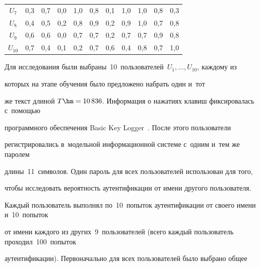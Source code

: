 \begin{table}
\begin{center}
\begin{tabular}{|c|c|c|c|c|c|c|c|c|c|c|}
         $U_7$&0,3&0,7&0,0&1,0&0,8&0,1&\cellcolor[gray]{.6}1,0&1,0&0,8&0,3\\        




         $U_8$&0,4&0,5&0,2&0,8&0,9&0,2&0,9&\cellcolor[gray]{.6}1,0&0,7&0,8\\




         $U_9$&0,6&0,6&0,0&0,7&0,7&0,2&0,7&0,7&\cellcolor[gray]{.6}0,9&0,8\\




         \hphantom{$_1$}$U_{10}$&0,7&0,4&0,1&0,2&0,7&0,6&0,4&0,8&0,7&\cellcolor[gray]{.6}         1,0\\


        \hline


        \end{tabular}


       \end{center}


       \vspace*{-12pt}


\end{table}





Для исследования были выбраны~10~пользователей~$U_1,\ldots,U_{10}$, каждому из 


которых на этапе обучения было предложено набрать один и~тот 


же текст длиной $T\hm=10\,836$. Информация о нажатиях клавиш фиксировалась с~помощью 


программного обеспечения Basic Key Logger~\cite{KeyLog}. После этого пользователи 


регистрировались в~модельной информационной системе с~одним и~тем же паролем 


длины~11~символов. Один пароль для всех пользователей использован для того, 


чтобы исследовать вероятность аутентификации от имени другого пользователя. 


Каждый пользователь выполнял по~10~попыток аутентификации от своего имени и~10~попыток 


от имени каждого из других~9~пользователей (всего каждый пользователь проходил~100~попыток 


аутентификации). Первоначально для всех пользователей было выбрано общее 


